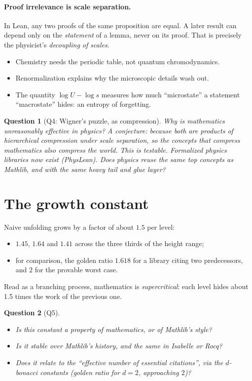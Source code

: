 \documentclass[11pt]{article}
\newtheorem*{question}{Question}
\begin{document}
\paragraph{Proof irrelevance is scale separation.} In Lean, any two proofs of the same
proposition are equal. A later result can depend only on the \emph{statement} of a lemma,
never on its proof. That is precisely the physicist's \emph{decoupling of scales}.
\begin{itemize}
\item Chemistry needs the periodic table, not quantum chromodynamics.
\item Renormalization explains why the microscopic details wash out.
\item The quantity $\log U-\log s$ measures how much ``microstate'' a statement
  ``macrostate'' hides: an entropy of forgetting.
\end{itemize}

\begin{question}[Q4: Wigner's puzzle, as compression]
Why is mathematics unreasonably effective in physics? A conjecture: because both are
products of hierarchical compression under scale separation, so the concepts that compress
mathematics also compress the world. This is testable. Formalized physics libraries now
exist (\emph{PhysLean}). Does physics reuse the same top concepts as Mathlib, and with the
same heavy tail and glue layer?
\end{question}

\section{The growth constant}

Naive unfolding grows by a factor of about $1.5$ per level:
\begin{itemize}
\item $1.45$, $1.64$ and $1.41$ across the three thirds of the height range;
\item for comparison, the golden ratio $1.618$ for a library citing two predecessors, and
  $2$ for the provable worst case.
\end{itemize}
Read as a branching process, mathematics is \emph{supercritical}: each level hides about
1.5 times the work of the previous one.

\begin{question}[Q5]
\begin{itemize}
\item Is this constant a property of mathematics, or of Mathlib's style?
\item Is it stable over Mathlib's history, and the same in Isabelle or Rocq?
\item Does it relate to the ``effective number of essential citations'', via the
  $d$-bonacci constants (golden ratio for $d=2$, approaching $2$)?
\end{itemize}
\end{question}
\end{document}
